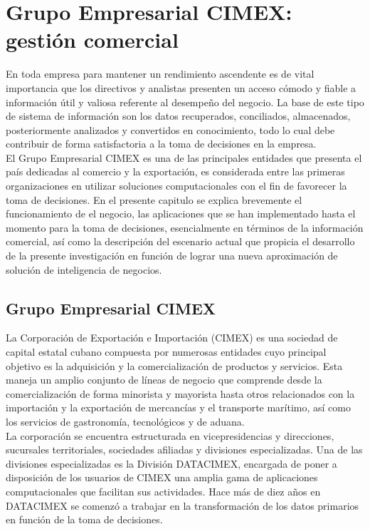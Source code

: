\chapter{Grupo Empresarial CIMEX: gestión comercial}\label{chapter:proposal}

En toda empresa para mantener un rendimiento ascendente es de vital importancia que los directivos y analistas presenten un acceso cómodo y fiable a información útil y valiosa referente al desempeño del negocio. La base de este tipo de sistema de información son los datos recuperados, conciliados, almacenados, posteriormente analizados y convertidos en conocimiento, todo lo cual debe contribuir de forma satisfactoria a la toma de decisiones en la empresa.\\

El Grupo Empresarial CIMEX es una de las principales entidades que presenta el país dedicadas al comercio y la exportación, es considerada entre las primeras organizaciones en utilizar soluciones computacionales con el fin de favorecer la toma de decisiones. En el presente capitulo se explica brevemente el funcionamiento de el negocio, las aplicaciones que se han implementado hasta el momento para la toma de decisiones, esencialmente en términos de la información comercial, así como la descripción del escenario actual que propicia el desarrollo de la presente investigación en función de lograr una nueva aproximación de solución de inteligencia de negocios.


\section*{Grupo Empresarial CIMEX}\label{CIMEX}
La Corporación de Exportación e Importación (CIMEX) es una sociedad de capital estatal cubano compuesta por numerosas entidades cuyo principal objetivo es la adquisición y la comercialización de productos y servicios. Esta maneja un amplio conjunto de líneas de negocio que comprende desde la comercialización de forma minorista y mayorista hasta otros relacionados con la importación y la exportación de mercancías y el transporte marítimo, así como los servicios de gastronomía, tecnológicos y de aduana.\\

La corporación se encuentra estructurada en vicepresidencias y direcciones, sucursales territoriales, sociedades afiliadas y divisiones especializadas. Una de las divisiones especializadas es la División DATACIMEX, encargada de poner a disposición de los usuarios de CIMEX una amplia gama de aplicaciones computacionales que facilitan sus actividades. Hace más de diez años en DATACIMEX se comenzó a trabajar en la transformación de los datos primarios en función de la toma de decisiones.\\

